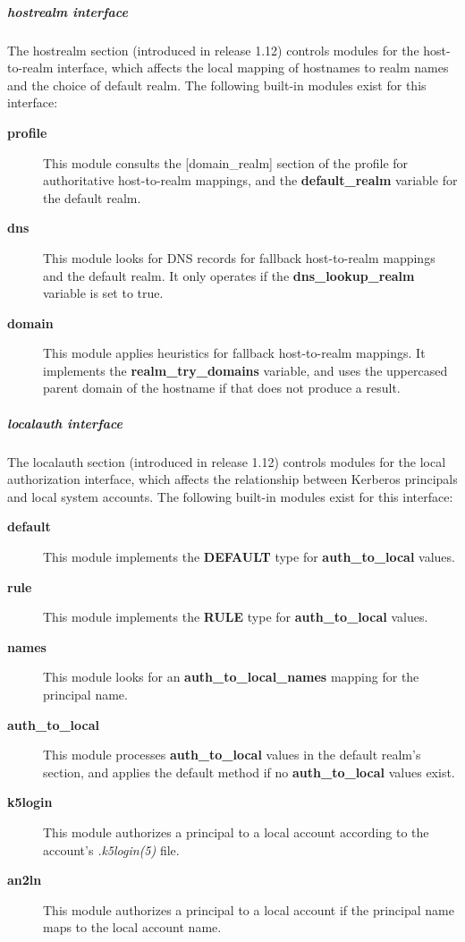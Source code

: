 \documentclass[letterpaper,10pt,english]{sphinxmanual}
\begin{document}
\subparagraph{hostrealm interface}
\label{admin/conf_files/krb5_conf:hostrealm-interface}\label{admin/conf_files/krb5_conf:hostrealm}
The hostrealm section (introduced in release 1.12) controls modules
for the host-to-realm interface, which affects the local mapping of
hostnames to realm names and the choice of default realm.  The following
built-in modules exist for this interface:
\begin{description}
\item[{\textbf{profile}}] \leavevmode
This module consults the {[}domain\_realm{]} section of the profile for
authoritative host-to-realm mappings, and the \textbf{default\_realm}
variable for the default realm.

\item[{\textbf{dns}}] \leavevmode
This module looks for DNS records for fallback host-to-realm
mappings and the default realm.  It only operates if the
\textbf{dns\_lookup\_realm} variable is set to true.

\item[{\textbf{domain}}] \leavevmode
This module applies heuristics for fallback host-to-realm
mappings.  It implements the \textbf{realm\_try\_domains} variable, and
uses the uppercased parent domain of the hostname if that does not
produce a result.

\end{description}


\subparagraph{localauth interface}
\label{admin/conf_files/krb5_conf:localauth-interface}\label{admin/conf_files/krb5_conf:localauth}
The localauth section (introduced in release 1.12) controls modules
for the local authorization interface, which affects the relationship
between Kerberos principals and local system accounts.  The following
built-in modules exist for this interface:
\begin{description}
\item[{\textbf{default}}] \leavevmode
This module implements the \textbf{DEFAULT} type for \textbf{auth\_to\_local}
values.

\item[{\textbf{rule}}] \leavevmode
This module implements the \textbf{RULE} type for \textbf{auth\_to\_local}
values.

\item[{\textbf{names}}] \leavevmode
This module looks for an \textbf{auth\_to\_local\_names} mapping for the
principal name.

\item[{\textbf{auth\_to\_local}}] \leavevmode
This module processes \textbf{auth\_to\_local} values in the default
realm's section, and applies the default method if no
\textbf{auth\_to\_local} values exist.

\item[{\textbf{k5login}}] \leavevmode
This module authorizes a principal to a local account according to
the account's \emph{.k5login(5)} file.

\item[{\textbf{an2ln}}] \leavevmode
This module authorizes a principal to a local account if the
principal name maps to the local account name.

\end{description}
\end{document}
